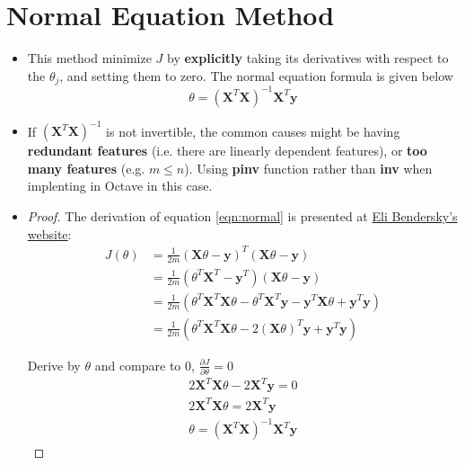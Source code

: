 \section{Normal Equation Method}
\begin{itemize}
    \item This method minimize $J$ by \textbf{explicitly} taking its derivatives with respect to the $\theta_j$, and setting them to zero. The normal equation formula is given below
    \begin{equation}\label{eqn:normal}
        \theta = \left(\mathbf{X}^T\mathbf{X}\right)^{-1}\mathbf{X}^T\mathbf{y}
    \end{equation}
    
    \item If $\left(\mathbf{X}^T\mathbf{X}\right)^{-1}$ is not invertible, the common causes might be having \textbf{redundant features} (i.e. there are linearly dependent features), or \textbf{too many features}  (e.g. $m \leq n$).
    Using \textbf{pinv} function rather than \textbf{inv} when implenting in Octave in this case.
    
    \item
    \begin{proof}
        The derivation of equation \ref{eqn:normal} is presented at \href{https://reurl.cc/0OY4zo}{Eli Bendersky's website}:
        \begin{equation}
            \begin{split}
                J(\theta) &= \frac{1}{2m} \left(\mathbf{X}\theta-\mathbf{y}\right)^{T} \left(\mathbf{X}\theta-\mathbf{y}\right)\\
                                   &= \frac{1}{2m} \left(\theta^{T}\mathbf{X}^{T} - \mathbf{y}^{T}\right) \left(\mathbf{X}\theta-\mathbf{y}\right)\\
                                   &= \frac{1}{2m} \left(\theta^{T}\mathbf{X}^{T}\mathbf{X}\theta - \theta^{T}\mathbf{X}^{T}\mathbf{y} - \mathbf{y}^{T}\mathbf{X}\theta + \mathbf{y}^{T}\mathbf{y}\right)\\
                                   &= \frac{1}{2m} \left(\theta^{T}\mathbf{X}^{T}\mathbf{X}\theta - 2\left(\mathbf{X}\theta\right)^{T}\mathbf{y} + \mathbf{y}^{T}\mathbf{y}\right)
            \end{split}
        \end{equation}
        
        Derive by $\theta$ and compare to 0, $\frac{\partial J}{\partial\theta} = 0$
        \begin{equation}
            \begin{split}
                2\mathbf{X}^T\mathbf{X}\theta - 2\mathbf{X}^T\mathbf{y} = 0\\
                2\mathbf{X}^T\mathbf{X}\theta = 2\mathbf{X}^T\mathbf{y}\\
                \theta = \left(\mathbf{X}^T\mathbf{X}\right)^{-1}\mathbf{X}^T\mathbf{y}
            \end{split}
        \end{equation}
    \end{proof}


\end{itemize}
